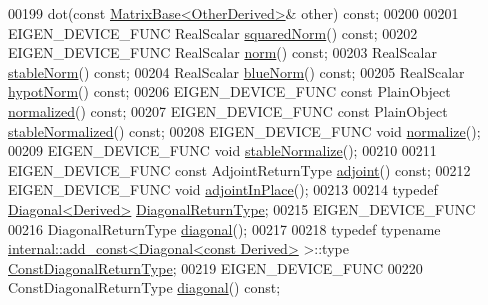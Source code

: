 \begin{DoxyCode}
00199     dot(\textcolor{keyword}{const} \hyperlink{group___core___module_class_eigen_1_1_matrix_base}{MatrixBase<OtherDerived>}& other) \textcolor{keyword}{const};
00200 
00201     EIGEN\_DEVICE\_FUNC RealScalar \hyperlink{group___core___module_a8782faeb21e43908cdce47cec06fba23}{squaredNorm}() \textcolor{keyword}{const};
00202     EIGEN\_DEVICE\_FUNC RealScalar \hyperlink{group___core___module_a196c4ec3c8ffdf5bda45d0f617154975}{norm}() \textcolor{keyword}{const};
00203     RealScalar \hyperlink{group___core___module_ab84d3e64f855813b1eea4202c0697dc1}{stableNorm}() \textcolor{keyword}{const};
00204     RealScalar \hyperlink{group___core___module_a3f3faa00163c16824ff03e58a210c74c}{blueNorm}() \textcolor{keyword}{const};
00205     RealScalar \hyperlink{group___core___module_a32222d3b6677e6cdf0b801463f329b72}{hypotNorm}() \textcolor{keyword}{const};
00206     EIGEN\_DEVICE\_FUNC \textcolor{keyword}{const} PlainObject \hyperlink{group___core___module_a5cf2fd4c57e59604fd4116158fd34308}{normalized}() \textcolor{keyword}{const};
00207     EIGEN\_DEVICE\_FUNC \textcolor{keyword}{const} PlainObject \hyperlink{group___core___module_a399dca938633b9f8df5ec4beefeccec0}{stableNormalized}() \textcolor{keyword}{const};
00208     EIGEN\_DEVICE\_FUNC \textcolor{keywordtype}{void} \hyperlink{group___core___module_ad16303c47ba36f7a41ea264cb26bceb6}{normalize}();
00209     EIGEN\_DEVICE\_FUNC \textcolor{keywordtype}{void} \hyperlink{group___core___module_a0b1443fa322615379557ade3399a3c3c}{stableNormalize}();
00210 
00211     EIGEN\_DEVICE\_FUNC \textcolor{keyword}{const} AdjointReturnType \hyperlink{group___core___module_afacca1f88da57e5cd87dd07c8ff926bb}{adjoint}() \textcolor{keyword}{const};
00212     EIGEN\_DEVICE\_FUNC \textcolor{keywordtype}{void} \hyperlink{group___core___module_a51c5982c1f64e45a939515b701fa6f4a}{adjointInPlace}();
00213 
00214     \textcolor{keyword}{typedef} \hyperlink{group___core___module_class_eigen_1_1_diagonal}{Diagonal<Derived>} \hyperlink{group___core___module_class_eigen_1_1_diagonal}{DiagonalReturnType};
00215     EIGEN\_DEVICE\_FUNC
00216     DiagonalReturnType \hyperlink{group___core___module_ab5768147536273eb2dbdfa389cfd26a3}{diagonal}();
00217 
00218     \textcolor{keyword}{typedef} \textcolor{keyword}{typename} \hyperlink{struct_eigen_1_1internal_1_1add__const}{internal::add\_const<Diagonal<const Derived>}
       >::type \hyperlink{group___core___module_class_eigen_1_1_transpose}{ConstDiagonalReturnType};
00219     EIGEN\_DEVICE\_FUNC
00220     ConstDiagonalReturnType \hyperlink{group___core___module_ab5768147536273eb2dbdfa389cfd26a3}{diagonal}() \textcolor{keyword}{const};

\end{DoxyCode}
